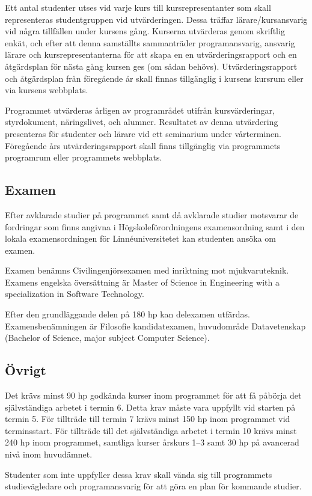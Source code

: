 Ett antal studenter utses vid varje kurs till kursrepresentanter som
skall representeras studentgruppen vid utvärderingen. Dessa träffar
lärare/kursansvarig vid några tillfällen under kursens gång. Kurserna
utvärderas genom skriftlig enkät, och efter att denna samställts
sammanträder programansvarig, ansvarig lärare och kursrepresentanterna för
att skapa en en utvärderingsrapport och en åtgärdsplan för nästa gång
kursen ges (om sådan behövs). Utvärderingsrapport och åtgärdsplan från
föregående år skall finnas tillgänglig i kursens kursrum eller via
kursens webbplats.

Programmet utvärderas årligen av programrådet utifrån kursvärderingar,
styrdokument, näringslivet, och alumner. Resultatet av denna utvärdering
presenteras för studenter och lärare vid ett seminarium under
vårterminen. Föregående års utvärderingsrapport skall finns tillgänglig
via programmets programrum eller programmets webbplats.

\subsection*{Examen}

Efter avklarade studier på programmet samt då avklarade studier
motsvarar de fordringar som finns angivna i Högskoleförordningens
examensordning samt i den lokala examensordningen för Linnéuniversitetet
kan studenten ansöka om examen.

Examen benämns Civilingenjörsexamen med inriktning mot mjukvaruteknik.
Examens engelska översättning är Master of Science in Engineering with a
specialization in Software Technology.

Efter den grundläggande delen på 180 hp kan delexamen utfärdas.
Examensbenämningen är Filosofie kandidatexamen, huvudområde
Datavetenskap (Bachelor of Science, major subject Computer Science).

\subsection*{Övrigt}

Det krävs minst 90 hp godkända kurser inom programmet för att få påbörja
det självständiga arbetet i termin 6. Detta krav måste vara uppfyllt vid
starten på termin 5. För tillträde till termin 7 krävs minst 150 hp inom
programmet vid terminsstart. För tillträde till det självständiga
arbetet i termin 10 krävs minst 240 hp inom programmet, samtliga kurser
årskurs 1--3 samt 30 hp på avancerad nivå inom huvudämnet.

Studenter som inte uppfyller dessa krav skall vända sig till programmets
studievägledare och programansvarig för att göra en plan för kommande
studier.

